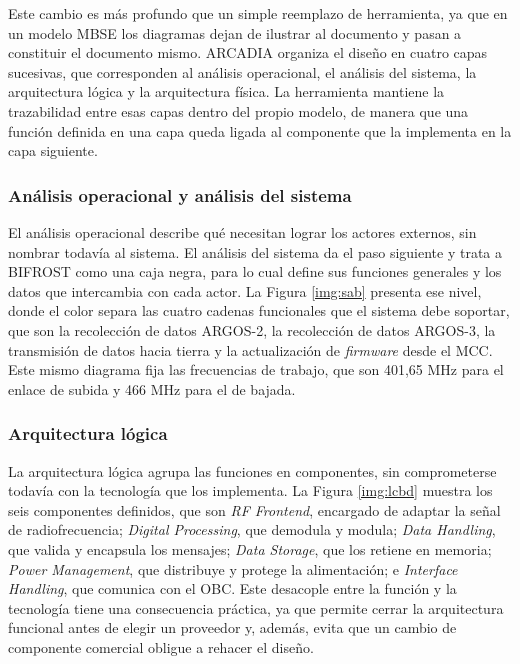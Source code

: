 Este cambio es más profundo que un simple reemplazo de herramienta, ya que en un modelo MBSE los diagramas dejan de ilustrar al documento y pasan a constituir el documento mismo. ARCADIA organiza el diseño en cuatro capas sucesivas, que corresponden al análisis operacional, el análisis del sistema, la arquitectura lógica y la arquitectura física. La herramienta mantiene la trazabilidad entre esas capas dentro del propio modelo, de manera que una función definida en una capa queda ligada al componente que la implementa en la capa siguiente.

\subsubsection{Análisis operacional y análisis del sistema}

El análisis operacional describe qué necesitan lograr los actores externos, sin nombrar todavía al sistema. El análisis del sistema da el paso siguiente y trata a BIFROST como una caja negra, para lo cual define sus funciones generales y los datos que intercambia con cada actor. La Figura \ref{img:sab} presenta ese nivel, donde el color separa las cuatro cadenas funcionales que el sistema debe soportar, que son la recolección de datos ARGOS-2, la recolección de datos ARGOS-3, la transmisión de datos hacia tierra y la actualización de \textit{firmware} desde el MCC. Este mismo diagrama fija las frecuencias de trabajo, que son 401,65 MHz para el enlace de subida y 466 MHz para el de bajada.


\subsubsection{Arquitectura lógica}

La arquitectura lógica agrupa las funciones en componentes, sin comprometerse todavía con la tecnología que los implementa. La Figura \ref{img:lcbd} muestra los seis componentes definidos, que son \textit{RF Frontend}, encargado de adaptar la señal de radiofrecuencia; \textit{Digital Processing}, que demodula y modula; \textit{Data Handling}, que valida y encapsula los mensajes; \textit{Data Storage}, que los retiene en memoria; \textit{Power Management}, que distribuye y protege la alimentación; e \textit{Interface Handling}, que comunica con el OBC. Este desacople entre la función y la tecnología tiene una consecuencia práctica, ya que permite cerrar la arquitectura funcional antes de elegir un proveedor y, además, evita que un cambio de componente comercial obligue a rehacer el diseño.

